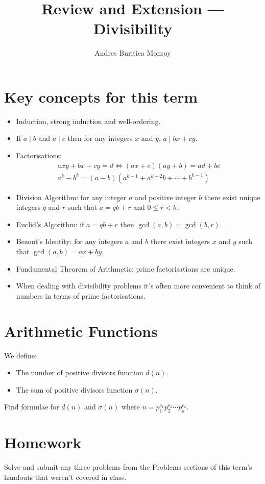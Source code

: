 \documentclass{article}
\title{Review and Extension --- Divisibility}
\author{Andres Buritica Monroy}
\date{}
\begin{document}
\maketitle
\section{Key concepts for this term}
  \begin{itemize}
    \item Induction, strong induction and well-ordering.
    \item If $a\mid b$ and $a\mid c$ then for any integers $x$ and $y$, $a\mid
      bx+cy$.
    \item Factorisations:
        \begin{align*}
          axy+bx+cy=d\iff (ax+c)(ay+b)=ad+bc \\
          a^k-b^k=(a-b)\left(a^{k-1}+a^{k-2}b+\cdots+b^{k-1}\right)
        \end{align*}
    \item Division Algorithm: for any integer $a$ and positive integer $b$ there
      exist unique integers $q$ and $r$ such that $a=qb+r$ and $0\le r<b$.
    \item Euclid's Algorithm: if $a=qb+r$ then $\gcd(a,b)=\gcd(b,r)$.
    \item Bezout's Identity: for any integers $a$ and $b$ there exist integers
      $x$ and $y$ such that $\gcd(a,b)=ax+by$.
    \item Fundamental Theorem of Arithmetic: prime factorisations are unique.
    \item When dealing with divisibility problems it's often more convenient to
      think of numbers in terms of prime factorisations.
  \end{itemize}
\section{Arithmetic Functions}
  We define:
  \begin{itemize}
    \item The number of positive divisors function $d(n)$.
    \item The sum of positive divisors function $\sigma(n)$.
  \end{itemize}
  Find formulae for $d(n)$ and $\sigma(n)$ where
    $n=p_1^{e_1}p_2^{e_2}\cdots p_k^{e_k}$.
\section{Homework}
Solve and submit any three problems from the Problems sections of this
    term's handouts that weren't covered in class.
\end{document}
